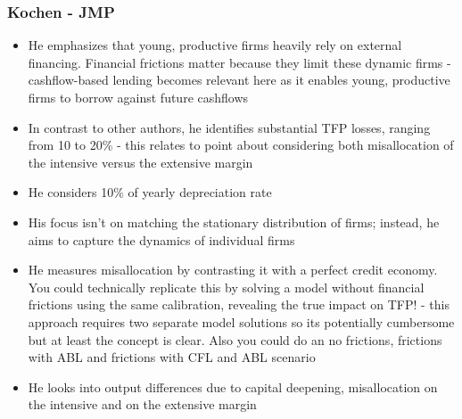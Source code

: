 \documentclass[12pt]{article}
\begin{document}
\subsubsection*{Kochen - JMP}
\begin{itemize}\setlength\itemsep{0em} \small
    \item He emphasizes that young, productive firms heavily rely on external financing. Financial frictions matter because they limit these dynamic firms - cashflow-based lending becomes relevant here as it enables young, productive firms to borrow against future cashflows
    \item In contrast to other authors, he identifies substantial TFP losses, ranging from 10 to 20\% - this relates to point about considering both misallocation of the intensive versus the extensive margin
    \item He considers 10\% of yearly depreciation rate
    \item His focus isn't on matching the stationary distribution of firms; instead, he aims to capture the dynamics of individual firms
    \item He measures misallocation by contrasting it with a perfect credit economy. You could technically replicate this by solving a model without financial frictions using the same calibration, revealing the true impact on TFP! - this approach requires two separate model solutions so its potentially cumbersome but at least the concept is clear. Also you could do an no frictions, frictions with ABL and frictions with CFL and ABL scenario
    \item He looks into output differences due to capital deepening, misallocation on the intensive and on the extensive margin\end{itemize} \normalsize
    
\end{document}
